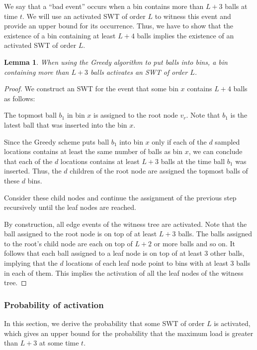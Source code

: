 \documentclass[a4paper,12pt]{article}
\newtheorem{lemma}{Lemma}
\begin{document}
We say that a ``bad event'' occurs when a bin contains more than $L+3$ balls at time $t$. We will use an activated SWT of order $L$ to witness this event and provide an upper bound for its occurrence. Thus, we have to show that the existence of a bin containing at least $L+4$ balls implies the existence of an activated SWT of order $L$. 

\begin{lemma}
When using the Greedy algorithm to put balls into bins, a bin containing more than $L+3$ balls activates an SWT of order $L$.
\end{lemma}

\begin{proof}
We construct an SWT for the event that some bin $x$ contains $L+4$ balls as follows:
\begin{compactenum}
\item The topmost ball $b_1$ in bin $x$ is assigned to the root node $v_r$. Note that $b_1$ is the latest ball that was inserted into the bin $x$.
\item Since the Greedy scheme puts ball $b_1$ into bin $x$ only if each of the $d$ sampled locations contains at least the same number of balls as bin $x$, we can conclude that each of the $d$ locations contains at least $L+3$ balls at the time ball $b_1$ was inserted. Thus, the $d$ children of the root node are assigned the topmost balls of these $d$ bins.
\item Consider these child nodes and continue the assignment of the previous step recursively until the leaf nodes are reached.  
\end{compactenum}

By construction, all edge events of the witness tree are activated. Note that the ball assigned to the root node is on top of at least $L+3$ balls. The balls assigned to the root's child node are each on top of $L+2$ or more balls and so on. It follows that each ball assigned to a leaf node is on top of at least 3 other balls, implying that the $d$ locations of each leaf node point to bins with at least 3 balls in each of them. This implies the activation of all the leaf nodes of the witness tree.
\end{proof}

\subsubsection{Probability of activation}
\label{sec:analysis:probabilitySymWT}
In this section, we derive the probability that some SWT of order $L$ is activated, which gives an upper bound for the probability that the maximum load is greater than $L+3$ at some time $t$. 
\end{document}
